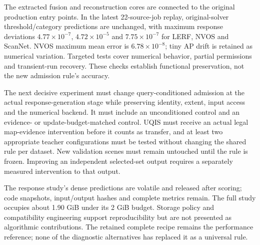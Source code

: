 \documentclass[10pt]{article}
\begin{document}
The extracted fusion and reconstruction cores are connected to the original
production entry points. In the latest 22-source-job replay, original-solver
threshold/category predictions are unchanged, with maximum response deviations
$4.77\times10^{-7}$, $4.72\times10^{-5}$ and $7.75\times10^{-7}$ for LERF,
NVOS and ScanNet. NVOS maximum mean error is $6.78\times10^{-8}$; tiny AP drift
is retained as numerical variation. Targeted tests cover numerical
behavior, partial permissions and transient-run recovery. These checks establish
functional preservation, not the new admission rule's accuracy.

The next decisive experiment must change query-conditioned admission at the
actual response-generation stage while preserving identity, extent, input
access and the numerical backend. It must include an unconditioned control and
an evidence- or update-budget-matched control. UQIS must receive an actual
legal map-evidence intervention before it counts as transfer, and at least two
appropriate teacher configurations must be tested without changing the shared
rule per dataset. New validation scenes must remain untouched until the rule
is frozen. Improving an independent selected-set output requires a separately
measured intervention to that output.

The response study's dense predictions are volatile and released after scoring;
code snapshots, input/output hashes and complete metrics remain. The full study
occupies about 1.90 GiB under its 2 GiB budget. Storage policy and compatibility
engineering support reproducibility but are not presented as algorithmic
contributions. The retained complete recipe remains the performance reference;
none of the diagnostic alternatives has replaced it as a universal rule.


\end{document}

